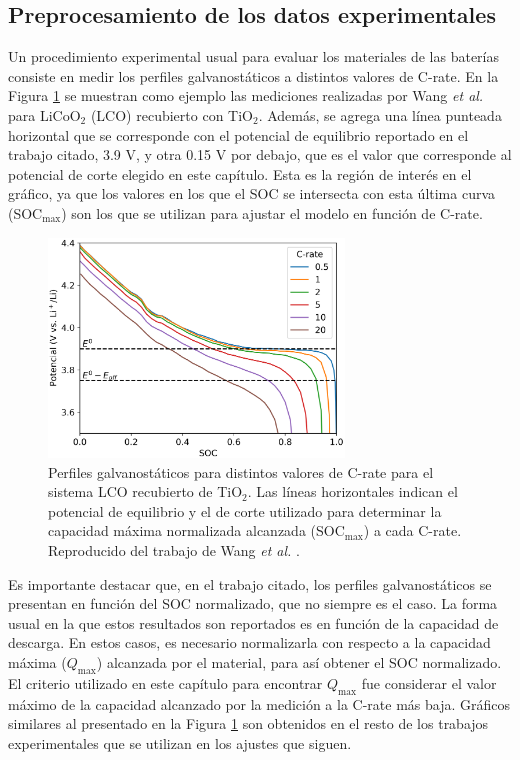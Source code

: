 \subsection{Preprocesamiento de los datos experimentales}

Un procedimiento experimental usual para evaluar los materiales de las baterías
consiste en medir los perfiles galvanostáticos a distintos valores de C-rate.
En la Figura \ref{fig:preproc} se muestran como ejemplo las mediciones realizadas
por Wang \textit{et al.} \cite{wang2019high} para LiCoO$_2$ (LCO) recubierto con 
TiO$_2$. Además, se agrega una línea punteada horizontal que se corresponde
con el potencial de equilibrio reportado en el trabajo citado, 3.9 V, y otra
0.15 V por debajo, que es el valor que corresponde al potencial de corte
elegido en este capítulo. Esta es la región de interés en el gráfico, ya que 
los valores en los que el SOC se intersecta con esta última curva (SOC$_{\max}$)
son los que se utilizan para ajustar el modelo en función de C-rate.

\begin{figure}[h!]
    \centering
    \includegraphics[width=0.7\textwidth]{FastCharging/un/resultados/preprocesamiento/preprocesamiento.png}
    \caption{Perfiles galvanostáticos para distintos valores de C-rate para el
    sistema LCO recubierto de TiO$_2$. Las líneas horizontales indican el 
    potencial de equilibrio y el de corte utilizado para determinar la 
    capacidad máxima normalizada alcanzada (SOC$_{\max}$) a cada C-rate. 
    Reproducido del trabajo de Wang \textit{et al.} \cite{wang2019high}.}
    \label{fig:preproc}
\end{figure}

Es importante destacar que, en el trabajo citado, los perfiles galvanostáticos
se presentan en función del SOC normalizado, que no siempre es el caso. La 
forma usual en la que estos resultados son reportados es en función de la 
capacidad de descarga. En estos casos, es necesario normalizarla con respecto
a la capacidad máxima ($Q_{\max}$) alcanzada por el material, para así obtener
el SOC normalizado. El criterio utilizado en este capítulo para encontrar 
$Q_{\max}$ fue considerar el valor máximo de la capacidad alcanzado por la 
medición a la C-rate más baja. Gráficos similares al presentado en la Figura 
\ref{fig:preproc} son obtenidos en el resto de los trabajos experimentales que
se utilizan en los ajustes que siguen.
